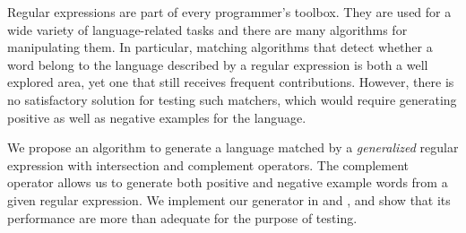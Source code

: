 Regular expressions are part of every programmer's toolbox.  They are
used for a wide variety of language-related tasks and there are many algorithms for
manipulating them. In particular, matching algorithms that detect
whether a word belong to the language described by a regular
expression is both a well explored area, 
yet one that still receives frequent contributions. However, there is
no satisfactory solution for testing such matchers, which would
require generating positive as well as negative examples for the language. 

We propose an algorithm to generate a language matched by a \emph{generalized}
regular expression with intersection and complement operators.
The complement operator allows us to generate both positive and
negative example words
from a given regular expression.
We implement our generator in \haskell and \ocaml,
and show that its performance are more than
adequate for the purpose of testing.

